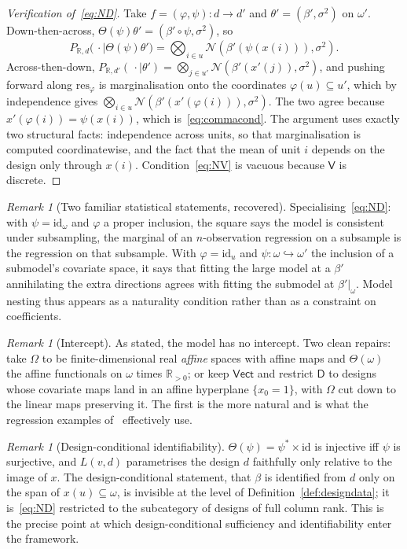 \documentclass[11pt,a4paper]{article}
\theoremstyle{plain}
\theoremstyle{definition}
\theoremstyle{remark}
\newtheorem{remark}[theorem]{Remark}
\newcommand{\cat}[1]{\mathsf{#1}}
\newcommand{\catV}{\cat{V}}
\newcommand{\catO}{\cat{\Omega}}
\newcommand{\catD}{\cat{D}}
\newcommand{\id}{\mathrm{id}}
\newcommand{\R}{\mathbb{R}}
\newcommand{\Vect}{\cat{Vect}}
\newcommand{\Norm}{\mathcal{N}}
\newcommand{\res}{\mathrm{res}}
\begin{document}
\begin{proof}[Verification of~\eqref{eq:ND}]
Take $f=(\varphi,\psi) \colon d \to d'$ and $\theta'=(\beta',\sigma^{2})$ on
$\omega'$. Down-then-across, $\Theta(\psi)\theta'
= (\beta'\circ\psi,\sigma^{2})$, so
\[
P_{\R,d}\bigl(\,\cdot \mid \Theta(\psi)\theta'\bigr)
= \bigotimes_{i\in u}\Norm(\beta'(\psi(x(i))),\sigma^{2}).
\]
Across-then-down, $P_{\R,d'}(\,\cdot\mid\theta')
= \bigotimes_{j\in u'}\Norm(\beta'(x'(j)),\sigma^{2})$, and pushing forward
along $\res_{\varphi}$ is marginalisation onto the coordinates
$\varphi(u) \subseteq u'$, which by independence gives
$\bigotimes_{i\in u}\Norm(\beta'(x'(\varphi(i))),\sigma^{2})$. The two agree
because $x'(\varphi(i)) = \psi(x(i))$, which is~\eqref{eq:commacond}. The
argument uses exactly two structural facts: independence across units, so that
marginalisation is computed coordinatewise, and the fact that the mean of unit
$i$ depends on the design only through $x(i)$. Condition~\eqref{eq:NV} is
vacuous because $\catV$ is discrete.
\end{proof}

\begin{remark}[Two familiar statistical statements, recovered]
Specialising~\eqref{eq:ND}: with $\psi = \id_{\omega}$ and $\varphi$ a proper
inclusion, the square says the model is consistent under subsampling, the
marginal of an $n$-observation regression on a subsample is the regression on
that subsample. With $\varphi = \id_{u}$ and
$\psi \colon \omega \hookrightarrow \omega'$ the inclusion of a submodel's
covariate space, it says that fitting the large model at a $\beta'$
annihilating the extra directions agrees with fitting the submodel at
$\beta'|_{\omega}$. Model nesting thus appears as a naturality condition
rather than as a constraint on coefficients.
\end{remark}

\begin{remark}[Intercept]
As stated, the model has no intercept. Two clean repairs: take $\catO$ to be
finite-dimensional real \emph{affine} spaces with affine maps and
$\Theta(\omega)$ the affine functionals on $\omega$ times $\R_{>0}$; or keep
$\Vect$ and restrict $\catD$ to designs whose covariate maps land in an affine
hyperplane $\{x_{0}=1\}$, with $\catO$ cut down to the linear maps preserving
it. The first is the more natural and is what the regression examples
of~\cite[\S6]{mccullagh_what_2002} effectively use.
\end{remark}

\begin{remark}[Design-conditional identifiability]\label{rem:identifiability}
$\Theta(\psi)=\psi^{*}\times\id$ is injective iff $\psi$ is surjective, and
$L(v,d)$ parametrises the design $d$ faithfully only relative to the image of
$x$. The design-conditional statement, that $\beta$ is identified from $d$
only on the span of $x(u) \subseteq \omega$, is invisible at the level of
Definition~\ref{def:designdata}; it is~\eqref{eq:ND} restricted to the
subcategory of designs of full column rank. This is the precise point at which
design-conditional sufficiency and identifiability enter the framework.
\end{remark}
\end{document}
